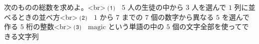 次のものの総数を求めよ。<br>
⑴　$5$ 人の生徒の中から $3$ 人を選んで $1$ 列に並べるときの並べ方<br>
⑵　$1$ から $7$ までの $7$ 個の数字から異なる $5$ を選んで作る $5$ 桁の整数<br>
⑶　$\mathrm{magic}$ という単語の中の $5$ 個の文字全部を使ってできる文字列